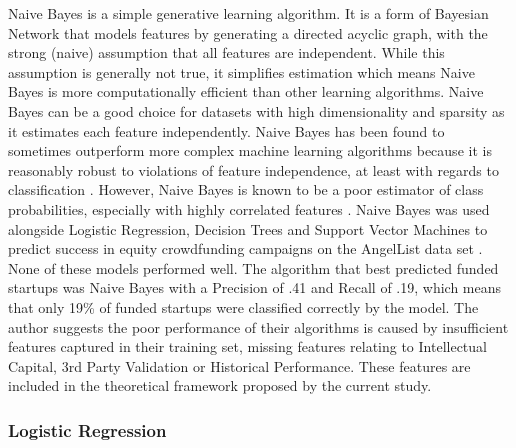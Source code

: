 \documentclass[../thesis/thesis.tex]{subfiles}
\begin{document}
Naive Bayes is a simple generative learning algorithm. It is a form of Bayesian Network that models features by generating a directed acyclic graph, with the strong (naive) assumption that all features are independent. While this assumption is generally not true, it simplifies estimation which means Naive Bayes is more computationally efficient than other learning algorithms. Naive Bayes can be a good choice for datasets with high dimensionality and sparsity as it estimates each feature independently. Naive Bayes has been found to sometimes outperform more complex machine learning algorithms because it is reasonably robust to violations of feature independence, at least with regards to classification \cite{niculescu2005}. However, Naive Bayes is known to be a poor estimator of class probabilities, especially with highly correlated features \cite{rish2001}. Naive Bayes was used alongside Logistic Regression, Decision Trees and Support Vector Machines to predict success in equity crowdfunding campaigns on the AngelList data set \cite{beckwith2016}. None of these models performed well. The algorithm that best predicted funded startups was Naive Bayes with a Precision of .41 and Recall of .19, which means that only 19\% of funded startups were classified correctly by the model. The author suggests the poor performance of their algorithms is caused by insufficient features captured in their training set, missing features relating to Intellectual Capital, 3rd Party Validation or Historical Performance. These features are included in the theoretical framework proposed by the current study.

\subsubsection{Logistic Regression}
\end{document}
